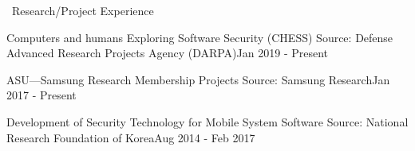 \documentclass{resume} %
\begin{document}

\begin{rSection}{\faGenderless~Research/Project Experience}

    \begin{rSubsection3}
        {Computers and humans Exploring Software Security (CHESS)}
        {Source: Defense Advanced Research Projects Agency (DARPA)}{Jan 2019 - Present}
    \end{rSubsection3}
    \vspace{-3mm}

	\begin{rSubsection3}
		{ASU---Samsung Research Membership Projects}
		{Source: Samsung Research}{Jan 2017 - Present}
	\end{rSubsection3}
	\vspace{-3mm}
	\begin{rSubsection3}
		{Development of Security Technology for Mobile System Software}
		{Source: National Research Foundation of Korea}{Aug 2014 - Feb 2017}
	\end{rSubsection3}
	\vspace{-3mm}
	\begin{rSubsection3}

\end{rSubsection3}
\end{rSection}
\end{document}
